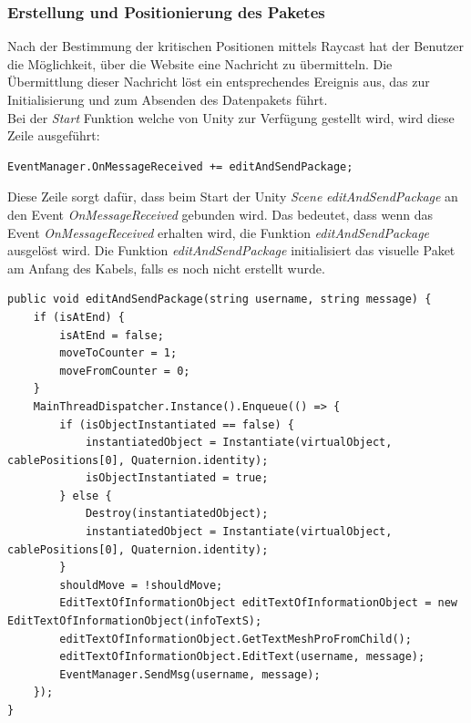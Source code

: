 \begin{itemize}
    \subsubsection{Erstellung und Positionierung des Paketes}\label{sec:PaketPos}
    Nach der Bestimmung der kritischen Positionen mittels Raycast hat der Benutzer die Möglichkeit, über die Website eine Nachricht zu übermitteln. Die Übermittlung dieser Nachricht löst ein entsprechendes Ereignis aus, das zur Initialisierung und zum Absenden des Datenpakets führt.\\
    Bei der \textit{Start} Funktion welche von Unity zur Verfügung gestellt  wird, wird diese Zeile ausgeführt:
    \begin{lstlisting}[style=csharp, caption={Binden an der Methode}, label=code:]
EventManager.OnMessageReceived += editAndSendPackage;
    \end{lstlisting}
    Diese Zeile sorgt dafür, dass beim Start der Unity \textit{Scene} \textit{editAndSendPackage} an den Event \textit{OnMessageReceived} gebunden wird. Das bedeutet, dass wenn das Event \textit{OnMessageReceived} erhalten wird, die Funktion \textit{editAndSendPackage} ausgelöst wird.
    Die Funktion \textit{editAndSendPackage} initialisiert das visuelle Paket am Anfang des Kabels, falls es noch nicht erstellt wurde.
    \begin{lstlisting}[style=csharp, caption={Initialisierung und Bearbeitung des Paketes}, label=code:editAndSendPackage]
public void editAndSendPackage(string username, string message) {
    if (isAtEnd) {
        isAtEnd = false;
        moveToCounter = 1;
        moveFromCounter = 0;
    }
    MainThreadDispatcher.Instance().Enqueue(() => {
        if (isObjectInstantiated == false) {
            instantiatedObject = Instantiate(virtualObject, cablePositions[0], Quaternion.identity);
            isObjectInstantiated = true;
        } else {
            Destroy(instantiatedObject);
            instantiatedObject = Instantiate(virtualObject, cablePositions[0], Quaternion.identity);
        }
        shouldMove = !shouldMove;
        EditTextOfInformationObject editTextOfInformationObject = new EditTextOfInformationObject(infoTextS);
        editTextOfInformationObject.GetTextMeshProFromChild();
        editTextOfInformationObject.EditText(username, message);
        EventManager.SendMsg(username, message);
    });
}
    \end{lstlisting}

\end{itemize}
